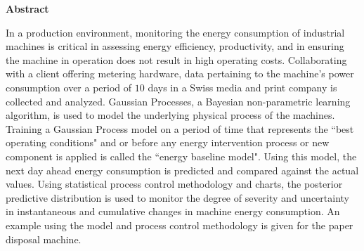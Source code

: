 \thispagestyle{plain}
\begin{center}
    \large
    \textbf{Abstract}
\end{center}

In a production environment, monitoring the energy consumption of industrial machines is critical in assessing energy efficiency, productivity, and in ensuring the machine in operation does not result in high operating costs. Collaborating with a client offering metering hardware, data pertaining to the machine's power consumption over a period of $10$ days in a Swiss media and print company is collected and analyzed. Gaussian Processes, a Bayesian non-parametric learning algorithm, is used to model the underlying physical process of the machines. Training a Gaussian Process model on a period of time that represents the ``best operating conditions" and or before any energy intervention process or new component is applied is called the ``energy baseline model". Using this model, the next day ahead energy consumption is predicted and compared against the actual values. Using statistical process control methodology and charts, the posterior predictive distribution is used to monitor the degree of severity and uncertainty in instantaneous and cumulative changes in machine energy consumption. An example using the model and process control methodology is given for the paper disposal machine.
